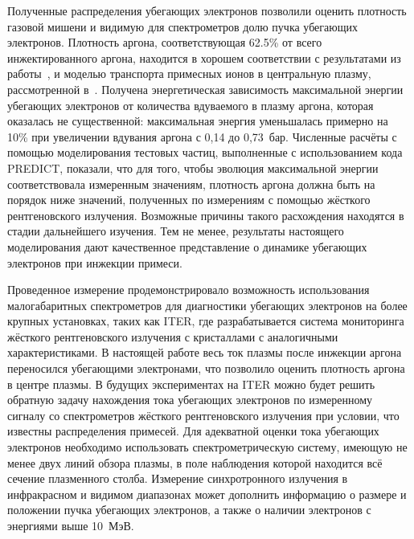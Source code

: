 Полученные распределения убегающих электронов позволили оценить плотность газовой мишени и видимую для спектрометров долю пучка убегающих электронов. Плотность аргона, соответствующая 62.5\% от всего инжектированного аргона, находится в хорошем соответствии с результатами из работы~\cite{Pautasso2020}, и моделью транспорта примесных ионов в центральную плазму, рассмотренной в~\cite{Linder2020}. Получена энергетическая зависимость максимальной энергии убегающих электронов от количества вдуваемого в плазму аргона, которая оказалась не существенной: максимальная энергия уменьшалась примерно на 10\% при увеличении вдувания аргона с 0,14 до 0,73~бар. Численные расчёты с помощью моделирования тестовых частиц, выполненные с использованием кода PREDICT, показали, что для того, чтобы эволюция максимальной энергии соответствовала измеренным значениям, плотность аргона должна быть на порядок ниже значений, полученных по измерениям с помощью жёсткого рентгеновского излучения. Возможные причины такого расхождения находятся в стадии дальнейшего изучения. Тем не менее, результаты настоящего моделирования дают качественное представление о динамике убегающих электронов при инжекции примеси.

Проведенное измерение продемонстрировало возможность использования малогабаритных спектрометров для диагностики убегающих электронов на более крупных установках, таких как ITER, где разрабатывается система мониторинга жёсткого рентгеновского излучения с кристаллами с аналогичными характеристиками. В настоящей работе весь ток плазмы после инжекции аргона переносился убегающими электронами, что позволило оценить плотность аргона в центре плазмы. В будущих экспериментах на ITER можно будет решить обратную задачу нахождения тока убегающих электронов по измеренному сигналу со спектрометров жёсткого рентгеновского излучения при условии, что известны распределения примесей. Для адекватной оценки тока убегающих электронов необходимо использовать спектрометрическую систему, имеющую не менее двух линий обзора плазмы, в поле наблюдения которой находится всё сечение плазменного столба. Измерение синхротронного излучения в инфракрасном и видимом диапазонах может дополнить информацию о размере и положении пучка убегающих электронов, а также о наличии электронов с энергиями выше 10~МэВ.


\FloatBarrier
